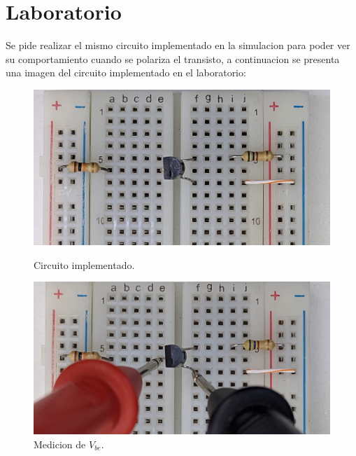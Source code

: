     

\newpage

    
  \section{Laboratorio}


    Se pide realizar el mismo circuito implementado en la simulacion para poder ver su comportamiento cuando se polariza el transisto, a continuacion se presenta una imagen del circuito implementado en el laboratorio:\\


    \begin{figure}[!ht]

        \begin{minipage}{0.5\textwidth}
            \includegraphics[width=1\textwidth]{tp3/pictures/prot_crkt-1.jpg}
            \caption{Circuito implementado.}
 
        \end{minipage}
                    \begin{minipage}{0.5\textwidth}
            \includegraphics[width=1\textwidth]{tp3/pictures/prot_crkt-1_Vbe.jpg}
            \caption{Medicion de $V_{be}$.}

        \end{minipage}
        

\end{figure}
